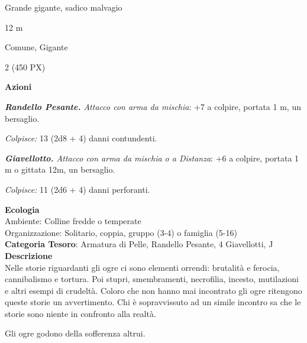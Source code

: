 \begin{multicols}{2}
{
\begin{description}[noitemsep, topsep=0pt, parsep=0pt, partopsep=0pt, itemsep=1pt, leftmargin=2.35cm,  labelwidth=2.2cm, itemindent=0cm, listparindent=0pt] %
\setlength{\baselineskip}{10pt}
\item[\textbf{Taglia/Tipo}] Grande gigante, sadico malvagio
\item[\textbf{Caratt.}] 
\item[\textbf{Punti Ferita}] 
\item[\textbf{Movimento}] 12 m
\item[\textbf{Tiri Salvez.}] 
\item[\textbf{Sensi}] 
\item[\textbf{Linguaggi}] Comune, Gigante
\item[\textbf{Sfida}] 2 (450 PX)
\end{description}
\smallskip

\textbf{Azioni}

\emph{\textbf{Randello Pesante.} Attacco con arma da mischia}: +7 a colpire, portata 1 m, un bersaglio.

\emph{Colpisce:} 13 (2d8 + 4) danni contundenti.

\emph{\textbf{Giavellotto.} Attacco con arma da mischia o a Distanza}: +6 a colpire, portata 1 m o gittata 12m, un bersaglio.

\emph{Colpisce:} 11 (2d6 + 4) danni perforanti.

\textbf{Ecologia}\\
Ambiente: Colline fredde o temperate\\
Organizzazione: Solitario, coppia, gruppo (3-4) o famiglia (5-16)\\
\textbf{Categoria Tesoro}: Armatura di Pelle, Randello Pesante, 4 Giavellotti, J\\
\textbf{Descrizione}\\
Nelle storie riguardanti gli ogre ci sono elementi orrendi: brutalità e ferocia, cannibalismo e tortura. Poi stupri, smembramenti, necrofilia, incesto, mutilazioni e altri esempi di crudeltà. Coloro che non hanno mai incontrato gli ogre ritengono queste storie un avvertimento. Chi è sopravvissuto ad un simile incontro sa che le storie sono niente in confronto alla realtà.

Gli ogre godono della sofferenza altrui.

}
\end{multicols}

